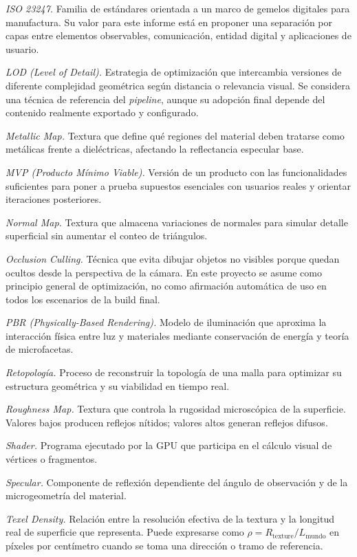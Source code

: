 \textit{ISO 23247.} Familia de estándares orientada a un marco de gemelos digitales para manufactura. Su valor para este informe está en proponer una separación por capas entre elementos observables, comunicación, entidad digital y aplicaciones de usuario.

\textit{LOD (\textit{Level of Detail}).} Estrategia de optimización que intercambia versiones de diferente complejidad geométrica según distancia o relevancia visual. Se considera una técnica de referencia del \textit{pipeline}, aunque su adopción final depende del contenido realmente exportado y configurado.

\textit{Metallic Map.} Textura que define qué regiones del material deben tratarse como metálicas frente a dieléctricas, afectando la reflectancia especular base.

\textit{MVP (Producto Mínimo Viable).} Versión de un producto con las funcionalidades suficientes para poner a prueba supuestos esenciales con usuarios reales y orientar iteraciones posteriores.

\textit{Normal Map.} Textura que almacena variaciones de normales para simular detalle superficial sin aumentar el conteo de triángulos.

\textit{Occlusion Culling.} Técnica que evita dibujar objetos no visibles porque quedan ocultos desde la perspectiva de la cámara. En este proyecto se asume como principio general de optimización, no como afirmación automática de uso en todos los escenarios de la build final.

\textit{PBR (\textit{Physically-Based Rendering}).} Modelo de iluminación que aproxima la interacción física entre luz y materiales mediante conservación de energía y teoría de microfacetas.

\textit{Retopología.} Proceso de reconstruir la topología de una malla para optimizar su estructura geométrica y su viabilidad en tiempo real.

\textit{Roughness Map.} Textura que controla la rugosidad microscópica de la superficie. Valores bajos producen reflejos nítidos; valores altos generan reflejos difusos.

\textit{Shader.} Programa ejecutado por la GPU que participa en el cálculo visual de vértices o fragmentos.

\textit{Specular.} Componente de reflexión dependiente del ángulo de observación y de la microgeometría del material.

\textit{Texel Density.} Relación entre la resolución efectiva de la textura y la longitud real de superficie que representa. Puede expresarse como $\rho = R_{\text{texture}} / L_{\text{mundo}}$ en píxeles por centímetro cuando se toma una dirección o tramo de referencia.

